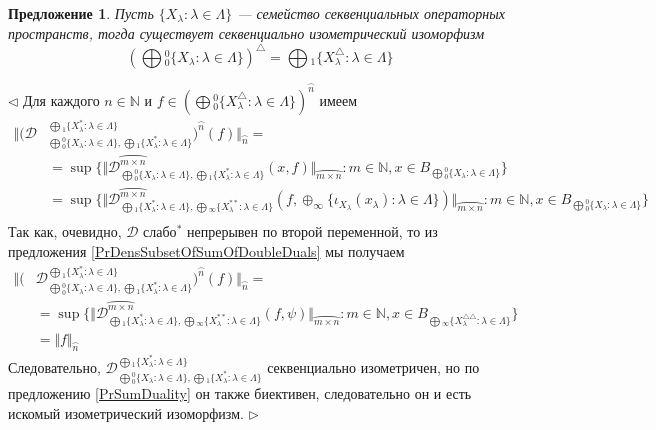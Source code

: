 \documentclass[12pt]{article}
\newtheorem{proposition}[theorem]{Предложение}
\newenvironment{proof}{\par $\triangleleft$}{$\triangleright$}
\begin{document}
\begin{proposition}\label{PrDualOfc0SumIsCoProd}
Пусть $\{X_\lambda:\lambda\in \Lambda\}$ --- семейство секвенциальных операторных пространств, тогда существует секвенциально изометрический изоморфизм
$$
\left(\bigoplus{}_0^0\{X_\lambda:\lambda\in \Lambda\}\right)^\triangle
=\bigoplus{}_1\{X_\lambda^\triangle:\lambda\in \Lambda\}
$$
\end{proposition}
\begin{proof}
Для каждого $n\in\mathbb{N}$ и $f\in \left(\bigoplus{}_0^0\{X_\lambda^\triangle:\lambda\in \Lambda\}\right)^{\wideparen{n}}$ имеем 
$$
\begin{aligned}
\Vert(\mathcal{D}&_{\bigoplus{}_0^0\{X_\lambda:\lambda\in \Lambda\},\bigoplus{}_1\{X_\lambda^*:\lambda\in \Lambda\}}^{\bigoplus{}_1\{X_\lambda^*:\lambda\in \Lambda\}})^{\wideparen{n}}(f)\Vert_{\wideparen{n}}=\\
&=\sup\{\Vert\mathcal{D}_{\bigoplus{}_0^0\{X_\lambda:\lambda\in \Lambda\},\bigoplus{}_1\{X_\lambda^*:\lambda\in \Lambda\}}^{\wideparen{m\times n}}(x,f)\Vert_{\wideparen{m\times n}}:m\in\mathbb{N}, x\in B_{\bigoplus{}_0^0\{X_\lambda:\lambda\in \Lambda\}}\}\\
&=\sup\{\Vert\mathcal{D}_{\bigoplus{}_1\{X_\lambda^*:\lambda\in \Lambda\},\bigoplus{}_\infty\{X_\lambda^{**}:\lambda\in \Lambda\}}^{\wideparen{m\times n}}(f,\oplus_\infty\{\iota_{X_\lambda}(x_\lambda):\lambda\in\Lambda\})\Vert_{\wideparen{m\times n}}:m\in\mathbb{N}, x\in B_{\bigoplus{}_0^0\{X_\lambda:\lambda\in \Lambda\}}\}\\
\end{aligned}
$$
Так как, очевидно, $\mathcal{D}$ слабо${}^*$ непрерывен по второй переменной, то из предложения \ref{PrDensSubsetOfSumOfDoubleDuals} мы получаем
$$
\begin{aligned}
\Vert(&\mathcal{D}_{\bigoplus{}_0^0\{X_\lambda:\lambda\in \Lambda\},\bigoplus{}_1\{X_\lambda^*:\lambda\in \Lambda\}}^{\bigoplus{}_1\{X_\lambda^*:\lambda\in \Lambda\}})^{\wideparen{n}}(f)\Vert_{\wideparen{n}}=\\
&=\sup\{\Vert\mathcal{D}_{\bigoplus{}_1\{X_\lambda^*:\lambda\in \Lambda\},\bigoplus{}_\infty\{X_\lambda^{**}:\lambda\in \Lambda\}}^{\wideparen{m\times n}}(f,\psi)\Vert_{\wideparen{m\times n}}:m\in\mathbb{N}, x\in B_{\bigoplus{}_\infty\{X_\lambda^{\triangle\triangle}:\lambda\in \Lambda\}}\}\\
&=\Vert f\Vert_{\wideparen{n}}
\end{aligned}
$$
Следовательно, $\mathcal{D}_{\bigoplus{}_0^0\{X_\lambda:\lambda\in \Lambda\},\bigoplus{}_1\{X_\lambda^*:\lambda\in \Lambda\}}^{\bigoplus{}_1\{X_\lambda^*:\lambda\in \Lambda\}}$ секвенциально изометричен, но по предложению \ref{PrSumDuality} он также биективен, следовательно он и есть искомый изометрический изоморфизм.
\end{proof}
\end{document}

